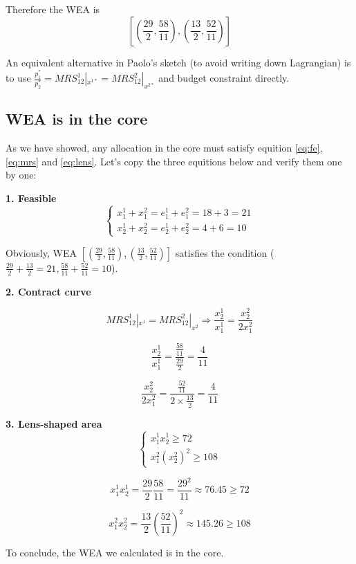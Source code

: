 \documentclass{article}
\begin{document}
Therefore the WEA is $$[(\frac{29}{2},\frac{58}{11} ),(\frac{13}{2},\frac{52}{11})]$$

\begin{mdframed}[backgroundcolor=blue!20,linecolor=white]

An equivalent alternative in Paolo's sketch (to avoid writing down Lagrangian) is to use $\frac{p^*_1}{p^*_2} = MRS^1_{12} |_{x^{1*}} = MRS^2_{12}|_{x^{2*}}$ and budget constraint directly. 

\end{mdframed}


\subsection{WEA is in the core}

As we have showed, any allocation in the core must satisfy equition \ref{eq:fe}, \ref{eq:mrs} and \ref{eq:lens}. Let's copy the three equitions below and verify them one by one:

\vspace{2mm}

\textbf{1. Feasible}
\begin{equation}
    \begin{cases}
x^1_1+x^2_1= e^1_1 +e^2_1 = 18+3 =21 \\
x^1_2+x^2_2= e^1_2 +e^2_2 = 4+6 =10
    \end{cases}
\nonumber
\end{equation}

Obviously, WEA $[(\frac{29}{2},\frac{58}{11} ),(\frac{13}{2},\frac{52}{11})]$ satisfies the condition
($\frac{29}{2}+\frac{13}{2}=21,\frac{58}{11} +\frac{52}{11}=10$).

\vspace{2mm}

\textbf{2. Contract curve}

\begin{equation}
MRS^1_{12} |_{x^1} = MRS^2_{12}|_{x^2} \Rightarrow
\frac{x^1_2}{x^1_1} = \frac{x^2_2}{2x^2_1}
\nonumber
\end{equation}

$$\frac{x^1_2}{x^1_1} = \frac{\frac{58}{11}}{\frac{29}{2}} = \frac{4}{11}$$

$$\frac{x^2_2}{2x^2_1} = \frac{\frac{52}{11}}{2 \times \frac{13}{2}}= \frac{4}{11}$$

\vspace{2mm}

\textbf{3. Lens-shaped area}
\begin{equation}
    \begin{cases}
x^1_1 x^1_2 \ge 72 \\
x^2_1 (x^2_2)^2 \ge 108    \end{cases}
\nonumber
\end{equation}

$$x^1_1 x^1_2 = \frac{29}{2} \frac{58}{11} = \frac{29^2}{11} \approx 76.45 \ge 72$$

$$x^2_1 x^2_2 = \frac{13}{2} (\frac{52}{11})^2  \approx 145.26 \ge 108$$

To conclude, the WEA we calculated is in the core.
\end{document}
